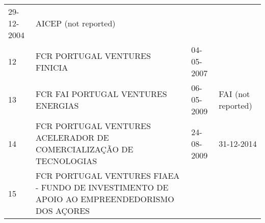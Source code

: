 \documentclass[]{book}
\theoremstyle{definition}
\theoremstyle{definition}
\theoremstyle{definition}
\theoremstyle{remark}
\begin{document}
\begin{longtable}[]{@{}llll@{}}
\begin{minipage}[t]{0.17\columnwidth}
29-12-2004\strut
\end{minipage} & \begin{minipage}[t]{0.17\columnwidth}\raggedright\strut
AICEP (not reported)\strut
\end{minipage}\tabularnewline
\begin{minipage}[t]{0.17\columnwidth}\raggedright\strut
12\strut
\end{minipage} & \begin{minipage}[t]{0.17\columnwidth}\raggedright\strut
FCR PORTUGAL VENTURES FINICIA\strut
\end{minipage} & \begin{minipage}[t]{0.17\columnwidth}\raggedright\strut
04-05-2007\strut
\end{minipage}\tabularnewline
\begin{minipage}[t]{0.17\columnwidth}\raggedright\strut
13\strut
\end{minipage} & \begin{minipage}[t]{0.17\columnwidth}\raggedright\strut
FCR FAI PORTUGAL VENTURES ENERGIAS\strut
\end{minipage} & \begin{minipage}[t]{0.17\columnwidth}\raggedright\strut
06-05-2009\strut
\end{minipage} & \begin{minipage}[t]{0.17\columnwidth}\raggedright\strut
FAI (not reported)\strut
\end{minipage}\tabularnewline
\begin{minipage}[t]{0.17\columnwidth}\raggedright\strut
14\strut
\end{minipage} & \begin{minipage}[t]{0.17\columnwidth}\raggedright\strut
FCR PORTUGAL VENTURES ACELERADOR DE COMERCIALIZAÇÃO DE TECNOLOGIAS\strut
\end{minipage} & \begin{minipage}[t]{0.17\columnwidth}\raggedright\strut
24-08-2009\strut
\end{minipage} & \begin{minipage}[t]{0.17\columnwidth}\raggedright\strut
31-12-2014\strut
\end{minipage}\tabularnewline
\begin{minipage}[t]{0.17\columnwidth}\raggedright\strut
15\strut
\end{minipage} & \begin{minipage}[t]{0.17\columnwidth}\raggedright\strut
FCR PORTUGAL VENTURES FIAEA - FUNDO DE INVESTIMENTO DE APOIO AO
EMPREENDEDORISMO DOS AÇORES\strut

\end{minipage}
\end{longtable}
\end{document}
